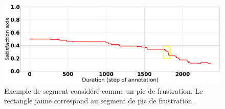 \begin{figure}[h]
  \centering
  \includegraphics[width=15cm]{./Chapitre7/figures/pic.jpeg}
  \caption{Exemple de segment considéré comme un pic de frustration. Le rectangle jaune correspond au segment de pic de frustration.}
  \label{fig:pic}
\end{figure}
